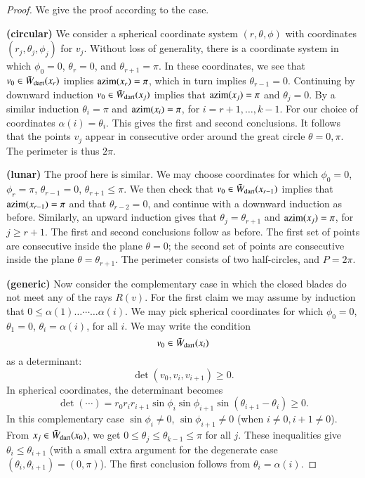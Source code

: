 {{\begin{proof}  We give the proof according to the case.

{\bf (circular)} We consider a spherical coordinate system $(r,\theta,\phi)$ with coordinates $(r_j,\theta_j,\phi_j)$ for $v_j$.  Without loss of generality, there is a coordinate system in which $\phi_0=0$, $\theta_r=0$, and $\theta_{r+1}=\pi$.  In these coordinates, we see that $v_0\in\bar W_{\text{dart}}(x_r)$ implies ${\operatorname{azim}}(x_r)=\pi$, which in turn implies $\theta_{r-1}=0$.  Continuing by downward induction $v_0\in \bar W_{\text{dart}}(x_j)$ implies that ${\operatorname{azim}}(x_j)=\pi$ and $\theta_j=0$.  By a similar induction $\theta_i=\pi$ and ${\operatorname{azim}}(x_i)=\pi$, for $i=r+1,\ldots,k-1$.  For our choice of coordinates $\alpha(i)=\theta_i$.  This gives the first and second conclusions.  It follows that the points $v_j$ appear in consecutive order around the great circle $\theta=0,\pi$.  The perimeter is thus $2\pi$.

{\bf (lunar)}  The proof here is similar.  We may choose coordinates for which $\phi_0=0$, $\phi_r=\pi$, $\theta_{r-1}=0$, $\theta_{r+1}\le\pi$.  We then check that $v_0\in \bar W_{\text{dart}}(x_{r-1})$ implies that ${\operatorname{azim}}(x_{r-1})=\pi$ and that $\theta_{r-2}=0$, and continue with a downward induction as before.  Similarly, an upward induction gives that $\theta_j=\theta_{r+1}$ and ${\operatorname{azim}}(x_j)=\pi$, for $j\ge r+1$.  The first and second conclusions follow as before.  The first set of points are consecutive inside the plane $\theta=0$; the second set of points are consecutive inside the plane $\theta=\theta_{r+1}$.  The perimeter consists of two half-circles, and $P=2\pi$.

{\bf (generic)} Now consider the complementary case in which the closed blades do not meet any of the rays $R(v)$.  For the first claim we may assume by induction that $0\le \alpha(1)\ldots\cdots\ldots \alpha(i)$.  We may pick spherical coordinates for which $\phi_0=0$, $\theta_1=0$, $\theta_i=\alpha(i)$, for all $i$.  We may write the condition
$$
v_0\in \bar W_{\text{dart}}(x_i)
$$
as a determinant:
$$
\det(v_0,v_i,v_{i+1})\ge 0.
$$
In spherical coordinates, the determinant becomes
$$
\det(\cdots)= r_0r_ir_{i+1}\sin\phi_i\sin\phi_{i+1}\sin(\theta_{i+1}-\theta_i)\ge0.
$$
In this complementary case $\sin\phi_i\ne0$, $\sin\phi_{i+1}\ne0$ (when $i\ne 0,i+1\ne 0$).  From $x_j\in \bar W_{\text{dart}}(x_0)$, we get $0\le\theta_j\le\theta_{k-1}\le\pi$ for all $j$.  These inequalities give $\theta_i\le\theta_{i+1}$ (with a small extra argument for the degenerate case $(\theta_i,\theta_{i+1})=(0,\pi)$).  The first conclusion follows from $\theta_i=\alpha(i)$.


\end{proof}}}
